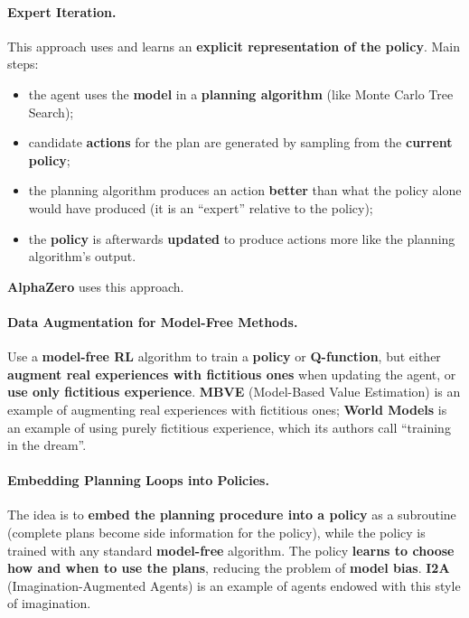 \documentclass[11pt,a4paper]{article}
\theoremstyle{definition}
\theoremstyle{plain}
\theoremstyle{remark}
\begin{document}
\paragraph{Expert Iteration.} This approach uses and learns an \textbf{explicit representation of the policy}. Main steps:
\begin{itemize}
    \item the agent uses the \textbf{model} in a \textbf{planning algorithm} (like Monte Carlo Tree Search);
    \item candidate \textbf{actions} for the plan are generated by sampling from the \textbf{current policy};
    \item the planning algorithm produces an action \textbf{better} than what the policy alone would have produced (it is an ``expert'' relative to the policy);
    \item the \textbf{policy} is afterwards \textbf{updated} to produce actions more like the planning algorithm's output.
\end{itemize}
\textbf{AlphaZero} uses this approach.

\paragraph{Data Augmentation for Model-Free Methods.} Use a \textbf{model-free RL} algorithm to train a \textbf{policy} or \textbf{Q-function}, but either \textbf{augment real experiences with fictitious ones} when updating the agent, or \textbf{use only fictitious experience}. \textbf{MBVE} (Model-Based Value Estimation) is an example of augmenting real experiences with fictitious ones; \textbf{World Models} is an example of using purely fictitious experience, which its authors call ``training in the dream''.

\paragraph{Embedding Planning Loops into Policies.} The idea is to \textbf{embed the planning procedure into a policy} as a subroutine (complete plans become side information for the policy), while the policy is trained with any standard \textbf{model-free} algorithm. The policy \textbf{learns to choose how and when to use the plans}, reducing the problem of \textbf{model bias}. \textbf{I2A} (Imagination-Augmented Agents) is an example of agents endowed with this style of imagination.

\end{document}
